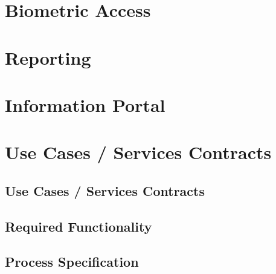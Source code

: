 \documentclass[11pt,a4paper,titlepage]{article}
\begin{document}
	\section{Biometric Access}
	
	
	\section{Reporting}
	
	
	\section{Information Portal}
	
		
		
	
	\section{Use Cases / Services Contracts}

	\subsection{Use Cases / Services Contracts}

		
		
	
	\subsection{Required Functionality}
		
		
	
	\subsection{Process Specification}
		
		
	

	
\end{document}
